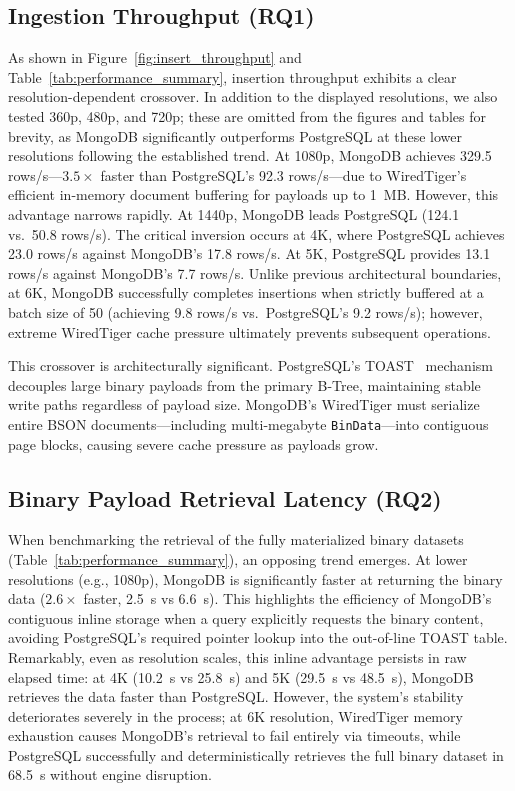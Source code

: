 \documentclass[conference, a4paper]{IEEEtran}
\begin{document}
\subsection{Ingestion Throughput (RQ1)}
\label{subsec:insert_throughput}
As shown in Figure~\ref{fig:insert_throughput} and Table~\ref{tab:performance_summary}, insertion throughput exhibits a clear resolution-dependent crossover. In addition to the displayed resolutions, we also tested 360p, 480p, and 720p; these are omitted from the figures and tables for brevity, as MongoDB significantly outperforms PostgreSQL at these lower resolutions following the established trend. At 1080p, MongoDB achieves 329.5 rows/s---$3.5\times$ faster than PostgreSQL's 92.3 rows/s---due to WiredTiger's efficient in-memory document buffering for payloads up to 1~MB. However, this advantage narrows rapidly. At 1440p, MongoDB leads PostgreSQL (124.1 vs.\ 50.8 rows/s). The critical inversion occurs at 4K, where PostgreSQL achieves 23.0 rows/s against MongoDB's 17.8 rows/s. At 5K, PostgreSQL provides 13.1 rows/s against MongoDB's 7.7 rows/s. Unlike previous architectural boundaries, at 6K, MongoDB successfully completes insertions when strictly buffered at a batch size of 50 (achieving 9.8 rows/s vs.\ PostgreSQL's 9.2 rows/s); however, extreme WiredTiger cache pressure ultimately prevents subsequent operations.

This crossover is architecturally significant. PostgreSQL's TOAST~\cite{postgresql_toast_docs} mechanism decouples large binary payloads from the primary B-Tree, maintaining stable write paths regardless of payload size. MongoDB's WiredTiger must serialize entire BSON documents---including multi-megabyte \texttt{BinData}---into contiguous page blocks, causing severe cache pressure as payloads grow.

\subsection{Binary Payload Retrieval Latency (RQ2)}
\label{subsec:retrieval_latency}
When benchmarking the retrieval of the fully materialized binary datasets (Table~\ref{tab:performance_summary}), an opposing trend emerges. At lower resolutions (e.g., 1080p), MongoDB is significantly faster at returning the binary data ($2.6\times$ faster, 2.5~s vs 6.6~s). This highlights the efficiency of MongoDB's contiguous inline storage when a query explicitly requests the binary content, avoiding PostgreSQL's required pointer lookup into the out-of-line TOAST table. Remarkably, even as resolution scales, this inline advantage persists in raw elapsed time: at 4K (10.2~s vs 25.8~s) and 5K (29.5~s vs 48.5~s), MongoDB retrieves the data faster than PostgreSQL. However, the system's stability deteriorates severely in the process; at 6K resolution, WiredTiger memory exhaustion causes MongoDB's retrieval to fail entirely via timeouts, while PostgreSQL successfully and deterministically retrieves the full binary dataset in 68.5~s without engine disruption.
\end{document}
